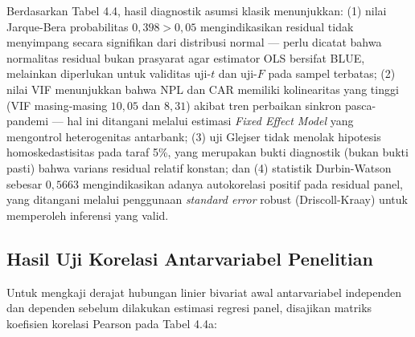 \documentclass[12pt,a4paper]{article}
\numberwithin{equation}{section}
\begin{document}
\noindent
Berdasarkan Tabel 4.4, hasil diagnostik asumsi klasik menunjukkan: (1) nilai Jarque-Bera probabilitas $0{,}398 > 0{,}05$ mengindikasikan residual tidak menyimpang secara signifikan dari distribusi normal --- perlu dicatat bahwa normalitas residual bukan prasyarat agar estimator OLS bersifat BLUE, melainkan diperlukan untuk validitas uji-$t$ dan uji-$F$ pada sampel terbatas; (2) nilai VIF menunjukkan bahwa NPL dan CAR memiliki kolinearitas yang tinggi (VIF masing-masing $10{,}05$ dan $8{,}31$) akibat tren perbaikan sinkron pasca-pandemi --- hal ini ditangani melalui estimasi \emph{Fixed Effect Model} yang mengontrol heterogenitas antarbank; (3) uji Glejser tidak menolak hipotesis homoskedastisitas pada taraf 5\%, yang merupakan bukti diagnostik (bukan bukti pasti) bahwa varians residual relatif konstan; dan (4) statistik Durbin-Watson sebesar $0{,}5663$ mengindikasikan adanya autokorelasi positif pada residual panel, yang ditangani melalui penggunaan \emph{standard error} robust (Driscoll-Kraay) untuk memperoleh inferensi yang valid.

\subsection{Hasil Uji Korelasi Antarvariabel Penelitian}

\noindent
Untuk mengkaji derajat hubungan linier bivariat awal antarvariabel independen dan dependen sebelum dilakukan estimasi regresi panel, disajikan matriks koefisien korelasi Pearson pada Tabel 4.4a:
\end{document}
